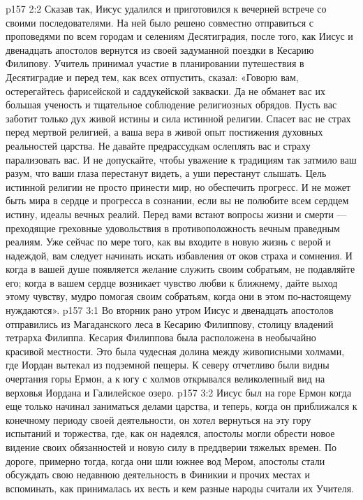 \vs p157 2:2 \pc Сказав так, Иисус удалился и приготовился к вечерней встрече со своими последователями. На ней было решено совместно отправиться с проповедями по всем городам и селениям Десятиградия, после того, как Иисус и двенадцать апостолов вернутся из своей задуманной поездки в Кесарию Филипову. Учитель принимал участие в планировании путешествия в Десятиградие и перед тем, как всех отпустить, сказал: «Говорю вам, остерегайтесь фарисейской и саддукейской закваски. Да не обманет вас их большая ученость и тщательное соблюдение религиозных обрядов. Пусть вас заботит только дух живой истины и сила истинной религии. Спасет вас не страх перед мертвой религией, а ваша вера в живой опыт постижения духовных реальностей царства. Не давайте предрассудкам ослеплять вас и страху парализовать вас. И не допускайте, чтобы уважение к традициям так затмило ваш разум, что ваши глаза перестанут видеть, а уши перестанут слышать. Цель истинной религии не просто принести мир, но обеспечить прогресс. И не может быть мира в сердце и прогресса в сознании, если вы не полюбите всем сердцем истину, идеалы вечных реалий. Перед вами встают вопросы жизни и смерти --- преходящие греховные удовольствия в противоположность вечным праведным реалиям. Уже сейчас по мере того, как вы входите в новую жизнь с верой и надеждой, вам следует начинать искать избавления от оков страха и сомнения. И когда в вашей душе появляется желание служить своим собратьям, не подавляйте его; когда в вашем сердце возникает чувство любви к ближнему, дайте выход этому чувству, мудро помогая своим собратьям, когда они в этом по\hyp{}настоящему нуждаются».
\vs p157 3:1 Во вторник рано утром Иисус и двенадцать апостолов отправились из Магаданского леса в Кесарию Филиппову, столицу владений тетрарха Филиппа. Кесария Филиппова была расположена в необычайно красивой местности. Это была чудесная долина между живописными холмами, где Иордан вытекал из подземной пещеры. К северу отчетливо были видны очертания горы Ермон, а к югу с холмов открывался великолепный вид на верховья Иордана и Галилейское озеро.
\vs p157 3:2 Иисус был на горе Ермон когда еще только начинал заниматься делами царства, и теперь, когда он приближался к конечному периоду своей деятельности, он хотел вернуться на эту гору испытаний и торжества, где, как он надеялся, апостолы могли обрести новое видение своих обязанностей и новую силу в преддверии тяжелых времен. По дороге, примерно тогда, когда они шли южнее вод Мером, апостолы стали обсуждать свою недавнюю деятельность в Финикии и прочих местах и вспоминать, как принималась их весть и кем разные народы считали их Учителя.
